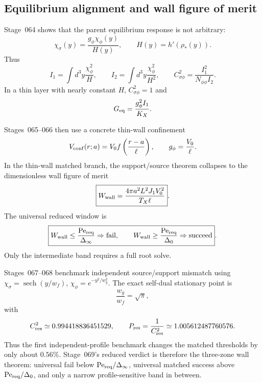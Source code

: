 \subsection{Equilibrium alignment and wall figure of merit}
\label{subsec:part03-wall-figure-merit}

Stage~064 shows that the parent equilibrium response is not arbitrary:
\begin{equation}
\label{eq:part03-equilibrium-source}
\chi_\sigma(y)=\frac{g_\phi\chi_\phi(y)}{H(y)},
\qquad
H(y)=h'(\rho_*(y)).
\end{equation}
Thus
\begin{equation}
\label{eq:part03-equilibrium-I}
I_1=\int d^3y\frac{\chi_\phi^2}{H},
\qquad
I_2=\int d^3y\frac{\chi_\phi^2}{H^2},
\qquad
C_{\sigma\phi}^2=\frac{I_1^2}{N_{\phi\phi}I_2}.
\end{equation}
In a thin layer with nearly constant \(H\), \(C_{\sigma\phi}^2=1\) and
\begin{equation}
\label{eq:part03-Geq}
G_{\rm eq}=\frac{g_\phi^2I_1}{K_X}.
\end{equation}

Stages~065--066 then use a concrete thin-wall confinement
\begin{equation}
\label{eq:part03-thin-wall-conf}
V_{\rm conf}(r;a)=V_0f\left(\frac{r-a}{\ell}\right),
\qquad
 g_\phi=\frac{V_0}{\ell}.
\end{equation}
In the thin-wall matched branch, the support/source theorem collapses to the dimensionless wall figure of merit
\begin{equation}
\label{eq:part03-Wwall}
\boxed{
W_{\rm wall}=\frac{4\pi a^2L^2J_1V_0^2}{T_X\ell}}.
\end{equation}
The universal reduced window is
\begin{equation}
\label{eq:part03-Wwall-window}
\boxed{
W_{\rm wall}\leq\frac{\mathrm{Pe}_{\rm req}}{\Delta_\infty}\Rightarrow\text{fail},
\qquad
W_{\rm wall}\geq\frac{\mathrm{Pe}_{\rm req}}{\Delta_0}\Rightarrow\text{succeed}}.
\end{equation}
Only the intermediate band requires a full root solve.

Stages~067--068 benchmark independent source/support mismatch using \(\chi_\sigma=\operatorname{sech}(y/w_f)\), \(\chi_\phi=e^{-y^2/w_g^2}\).  The exact self-dual stationary point is
\begin{equation}
\label{eq:part03-sech-gauss}
\frac{w_g}{w_f}=\sqrt\pi,
\end{equation}
with
\begin{equation}
\label{eq:part03-Cres-Pres}
C_{\rm res}^2\simeq0.994418836451529,
\qquad
P_{\rm res}=\frac{1}{C_{\rm res}^2}\simeq1.005612487760576.
\end{equation}
Thus the first independent-profile benchmark changes the matched thresholds by only about \(0.56\%\).  Stage~069's reduced verdict is therefore the three-zone wall theorem: universal fail below \(\mathrm{Pe}_{\rm req}/\Delta_\infty\), universal matched success above \(\mathrm{Pe}_{\rm req}/\Delta_0\), and only a narrow profile-sensitive band in between.

